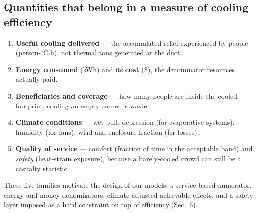 \documentclass[11pt]{article}
\newcommand{\degrees}{\ensuremath{^\circ}}
\begin{document}
\subsection{Quantities that belong in a measure of cooling efficiency}
\begin{enumerate}[label=\textbf{Q\arabic*.}]
\item \textbf{Useful cooling delivered} --- the accumulated relief experienced by people (person-$\degrees$C$\cdot$h), not thermal tons generated at the duct.
\item \textbf{Energy consumed} (kWh) and its \textbf{cost} (\$), the denominator resources actually paid.
\item \textbf{Beneficiaries and coverage} --- how many people are inside the cooled footprint; cooling an empty corner is waste.
\item \textbf{Climate conditions} --- wet-bulb depression (for evaporative systems), humidity (for fans), wind and enclosure fraction (for losses).
\item \textbf{Quality of service} --- comfort (fraction of time in the acceptable band) and \emph{safety} (heat-strain exposure), because a barely-cooled crowd can still be a casualty statistic.
\end{enumerate}
These five families motivate the design of our models: a service-based numerator, energy and money denominators, climate-adjusted achievable effects, and a safety layer imposed as a hard constraint on top of efficiency (Sec.~6).

\end{document}
